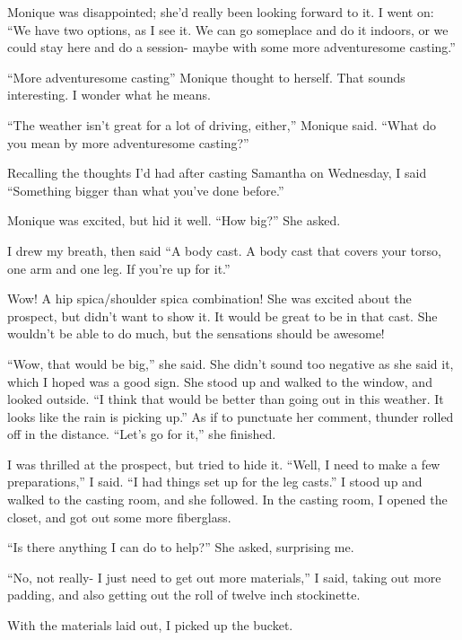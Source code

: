 Monique was disappointed; she'd really been looking forward to it. I went on: ``We have
two options, as I see it. We can go someplace and do it indoors, or we could stay here and do a
session- maybe with some more adventuresome casting.''

\begin{thought}
``More adventuresome casting'' Monique thought to herself. That sounds interesting. I
wonder what he means.
\end{thought}

``The weather isn't great for a lot of driving, either,'' Monique said. ``What do you mean
by more adventuresome casting?''

Recalling the thoughts I'd had after casting Samantha on Wednesday, I said ``Something
bigger than what you've done before.''

Monique was excited, but hid it well. ``How big?'' She asked.

I drew my breath, then said ``A body cast. A body cast that covers your torso, one arm and
one leg. If you're up for it.''

\begin{thought}
Wow! A hip spica/shoulder spica combination! She was excited about the prospect, but
didn't want to show it. It would be great to be in that cast. She wouldn't be able to do much,
but the sensations should be awesome!
\end{thought}

``Wow, that would be big,'' she said. She didn't sound too negative as she said it, which
I hoped was a good sign. She stood up and walked to the window, and looked outside. ``I think
that would be better than going out in this weather. It looks like the rain is picking up.'' As
if to punctuate her comment, thunder rolled off in the distance. ``Let's go for it,'' she
finished.

I was thrilled at the prospect, but tried to hide it. ``Well, I need to make a few
preparations,'' I said. ``I had things set up for the leg casts.'' I stood up and walked to the
casting room, and she followed. In the casting room, I opened the closet, and got out some more
fiberglass.

``Is there anything I can do to help?'' She asked, surprising me.

``No, not really- I just need to get out more materials,'' I said, taking out more
padding, and also getting out the roll of twelve inch stockinette.

With the materials laid out, I picked up the bucket.

